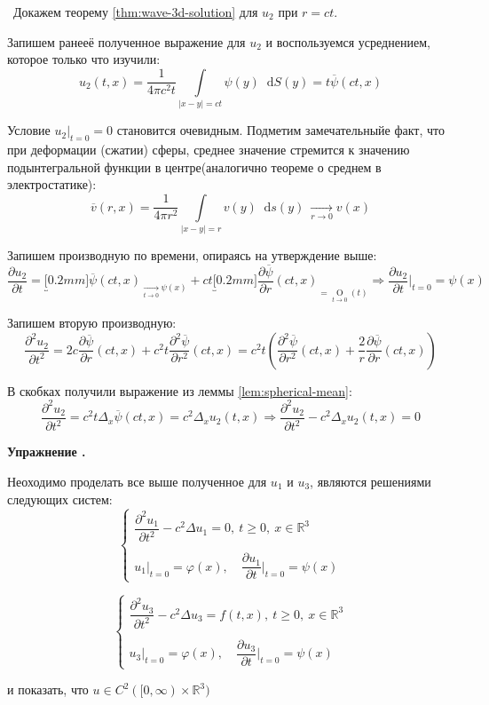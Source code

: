 \documentclass[11pt,a4paper]{report}
\numberwithin{equation}{section}
\numberwithin{figure}{chapter}
\numberwithin{table}{chapter}
\newif\ifinmathphysstatement
\newenvironment{myexe}[1][]{%
    \refstepcounter{exectr}%
    \inmathphysstatementtrue
    \begin{tcolorbox}[mathphysblock,colframe=exercisecolor,colback=exercisecolor!3,#1]
    \textbf{\color{exercisecolor}Упражнение \theexectr.}\par\smallskip
}{%
    \end{tcolorbox}
    \inmathphysstatementfalse
}
\newcommand{\R}{\mathbb{R}}
\newcommand{\p}{\partial}
\newcommand{\dd}{\mathop{}\!\mathrm{d}}
\newcommand{\skobka}[1]{\left( #1 \right)}
\newcommand{\bigo}[2]{\mathop{O}\limits_{#1}\!\left(#2\right)}
\begin{document}
\
Докажем теорему \ref{thm:wave-3d-solution} для $u_2$ при $r=ct$.

Запишем ранееё полученное выражение для $u_2$ и воспользуемся усреднением, которое только что изучили:
\[
u_2(t,x) = \dfrac{1}{4\pi c^2t}\int\limits_{|x-y|=ct}\psi(y)\dd S(y) = t\overline{\psi}(ct,x)
\]

Условие $u_2\Big|_{t=0} = 0$ становится очевидным.
Подметим замечательныйе факт, что при деформации (сжатии) сферы,  среднее значение стремится к значению подынтегральной функции в центре(аналогично теореме о среднем в электростатике):
\[
\overline{v}(r,x) = \dfrac{1}{4\pi r^2}\int\limits_{|x-y|=r}v(y)\dd s(y) \ \xrightarrow[r\to0]{}v(x)
\]

Запишем производную по времени, опираясь на утверждение выше:
\[
\dfrac{\p u_2}{\p t} = \underbracket[0.2mm]{\overline{\psi}(ct,x)}_{\xrightarrow[t\to0]{}\psi(x)} + ct\underbracket[0.2mm]{\dfrac{\p \overline{\psi}}{\p r}(ct,x)}_{=\bigo{t\to0}{t}} \Rightarrow \dfrac{\p u_2}{\p t}\Big|_{t=0} = \psi(x)
\]

Запишем вторую производную:
\[
\dfrac{\p^2 u_2}{\p t^2} = 2c\dfrac{\p\overline{\psi}}{\p r}(ct,x) + c^2t\dfrac{\p^2\overline{\psi}}{\p r^2}(ct,x) = c^2t\skobka{\dfrac{\p^2\overline{\psi}}{\p r^2}(ct,x) + \dfrac{2}{r}\dfrac{\p\overline{\psi}}{\p r}(ct,x)}
\]

В скобках получили выражение из леммы \ref{lem:spherical-mean}:
\[
\dfrac{\p^2 u_2}{\p t^2} = c^2t\Delta_x\overline{\psi}(ct,x) = c^2\Delta_xu_2(t,x) \Rightarrow \dfrac{\p^2 u_2}{\p t^2} -c^2\Delta_xu_2(t,x)=0
\]

\begin{myexe}
    Неоходимо проделать все выше полученное для $u_1$ и $u_3$, 
    являются решениями следующих систем:
    \[
\begin{cases}
    \dfrac{\p^2 u_1}{\p t^2} - c^2\Delta u_1 = 0, \ t\geq0, \ x\in\R^3\\
    \\
    u_1\Big|_{t=0} = \varphi(x), \quad \dfrac{\p u_1}{\p t}\Big|_{t=0} = \psi(x)
\end{cases}
\]

    \[
\begin{cases}
    \dfrac{\p^2 u_3}{\p t^2} - c^2\Delta u_3 = f(t,x), \ t\geq0, \ x\in\R^3\\
    \\
    u_3\Big|_{t=0} = \varphi(x), \quad \dfrac{\p u_3}{\p t}\Big|_{t=0} = \psi(x)
\end{cases}
\]



     и показать, что $u\in C^2([0,\infty)\times\R^3) $
\end{myexe}
\end{document}
